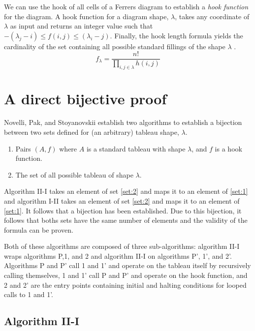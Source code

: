 \documentclass[11pt]{article}
\theoremstyle{definition}
\begin{document}
We can use the hook of all cells of a Ferrers diagram to establish a \emph{hook function} for the diagram. A hook function for a diagram shape, $\lambda$, takes any coordinate of $\lambda$ as input and returns an integer value such that $-(\lambda_{j} - i) \leq f(i,j) \leq (\lambda_{i} - j)$.
Finally, the hook length formula yields the cardinality of the set containing all possible standard fillings of the shape $\lambda$ \cite{Probabilistic}.
\begin{equation}
f_\lambda = \frac{n!}{
	\displaystyle \prod_{i,j \in \lambda} h(i,j)
}
\end{equation}
\section{A direct bijective proof}
Novelli, Pak, and Stoyanovskii \cite{Novelli} establish two algorithms to establish a bijection between two sets defined for (an arbitrary) tableau shape, $\lambda$. 
\begin{enumerate}[label=\Roman*:]
	\item\label{set:1} Pairs $(A,f)$ where $A$ is a standard tableau with shape $\lambda$, and $f$ is a hook function.
    \item\label{set:2} The set of all possible tableau of shape $\lambda$.
\end{enumerate}

Algorithm II-I takes an element of set \ref{set:2} and maps it to an element of \ref{set:1} and algorithm I-II takes an element of set \ref{set:2} and maps it to an element of \ref{set:1}. It follows that a bijection has been established. Due to this bijection, it follows that boths sets have the same number of elements and the validity of the formula can be proven.

Both of these algorithms are composed of three sub-algorithms: algorithm II-I wraps algorithms P,1, and 2 and algorithm II-I on algorithms P', 1', and 2'. Algorithms P and P' call 1 and 1' and operate on the tableau itself by recursively calling themselves, 1 and 1' call P and P' and operate on the hook function, and 2 and 2' are the entry points containing initial and halting conditions for looped calls to 1 and 1'. 




\subsection{Algorithm II-I}
\end{document}
